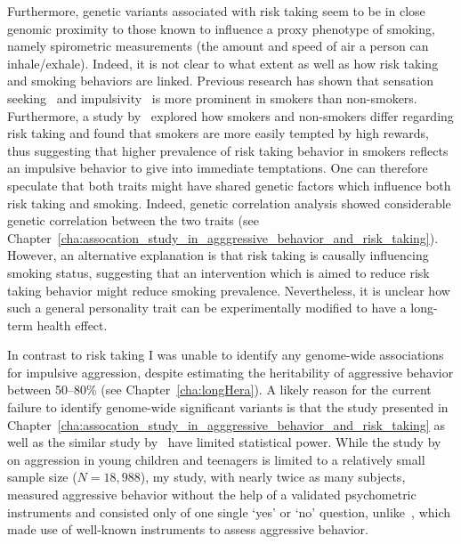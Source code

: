 Furthermore, genetic variants associated with risk taking seem to be in close genomic proximity to those known to influence a proxy phenotype of smoking, namely spirometric measurements (the amount and speed of air a person can inhale/exhale).
Indeed, it is not clear to what extent as well as how risk taking and smoking behaviors are linked.
Previous research has shown that sensation seeking~\cite{Carton1994} and impulsivity~\cite{Glicksohn2007,Mitchell1999} is more prominent in smokers than non-smokers.
Furthermore, a study by~\citet{Ert2013} explored how smokers and non-smokers differ regarding risk taking and found that smokers are more easily tempted by high rewards,
thus suggesting that higher prevalence of risk taking behavior in smokers reflects an impulsive behavior to give into immediate temptations. 
One can therefore speculate that both traits might have shared genetic factors which influence both risk taking and smoking.
Indeed, genetic correlation analysis showed considerable genetic correlation between the two traits (see Chapter~\ref{cha:assocation_study_in_agggressive_behavior_and_risk_taking}).
However, an alternative explanation is that risk taking is causally influencing smoking status,
suggesting that an intervention which is aimed to reduce risk taking behavior might reduce smoking prevalence. 
Nevertheless, it is unclear how such a general personality trait can be experimentally modified to have a long-term health effect.

In contrast to risk taking I was unable to identify any genome-wide associations for impulsive aggression, despite estimating the heritability of aggressive behavior between 50--80\% (see Chapter~\ref{cha:longHera}).
A likely reason for the current failure to identify genome-wide significant variants is that the study presented in Chapter~\ref{cha:assocation_study_in_agggressive_behavior_and_risk_taking} as well as the similar study by~\citet{Pappa2016a} have limited statistical power.
While the study by~\cite{Pappa2016a} on aggression in young children and teenagers is limited to a relatively small sample size ($N=18,988$),
my study, with nearly twice as many subjects, measured aggressive behavior without the help of a validated psychometric instruments and consisted only of one single `yes' or `no' question, unlike~\citet{Pappa2016a}, which made use of well-known instruments to assess aggressive behavior.

